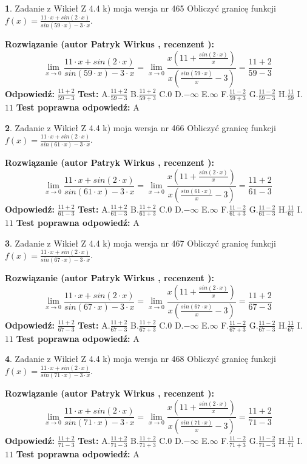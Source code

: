 \documentclass[12pt, a4paper]{article}
\theoremstyle{definition} %
\newtheorem{zad}{}
\newcommand{\zadStart}[1]{\begin{zad}#1\newline}
\newcommand{\zadStop}{\end{zad}}
\newcommand{\rozwStart}[2]{\noindent \textbf{Rozwiązanie (autor #1 , recenzent #2): }\newline}
\newcommand{\rozwStop}{\newline}
\newcommand{\odpStart}{\noindent \textbf{Odpowiedź:}\newline}
\newcommand{\odpStop}{\newline}
\newcommand{\testStart}{\noindent \textbf{Test:}\newline}
\newcommand{\testStop}{\newline}
\newcommand{\kluczStart}{\noindent \textbf{Test poprawna odpowiedź:}\newline}
\newcommand{\kluczStop}{\newline}
\begin{document}
\zadStart{Zadanie z Wikieł Z 4.4 k) moja wersja nr 465}
Obliczyć granicę funkcji $f(x)=\frac{11\cdot x +sin(2\cdot x)}{sin(59\cdot x) -3\cdot x}$.
\zadStop
\rozwStart{Patryk Wirkus}{}
$$\lim\limits_{x\to 0}\frac{11\cdot x +sin(2\cdot x)}{sin(59\cdot x) -3\cdot x}
=\lim\limits_{x\to 0}\frac{x(11+\frac{sin(2\cdot x)}{x})}{x(\frac{sin(59\cdot x)}{x}-3)}
=\frac{11+2}{59-3}$$
\rozwStop
\odpStart
$\frac{11+2}{59-3}$
\odpStop
\testStart
A.$\frac{11+2}{59-3}$
B.$\frac{11+2}{59+3}$
C.$0$
D.$-\infty$
E.$\infty$
F.$\frac{11-2}{59+3}$
G.$\frac{11-2}{59-3}$
H.$\frac{11}{59}$
I.$11$
\testStop
\kluczStart
A
\kluczStop



\zadStart{Zadanie z Wikieł Z 4.4 k) moja wersja nr 466}
Obliczyć granicę funkcji $f(x)=\frac{11\cdot x +sin(2\cdot x)}{sin(61\cdot x) -3\cdot x}$.
\zadStop
\rozwStart{Patryk Wirkus}{}
$$\lim\limits_{x\to 0}\frac{11\cdot x +sin(2\cdot x)}{sin(61\cdot x) -3\cdot x}
=\lim\limits_{x\to 0}\frac{x(11+\frac{sin(2\cdot x)}{x})}{x(\frac{sin(61\cdot x)}{x}-3)}
=\frac{11+2}{61-3}$$
\rozwStop
\odpStart
$\frac{11+2}{61-3}$
\odpStop
\testStart
A.$\frac{11+2}{61-3}$
B.$\frac{11+2}{61+3}$
C.$0$
D.$-\infty$
E.$\infty$
F.$\frac{11-2}{61+3}$
G.$\frac{11-2}{61-3}$
H.$\frac{11}{61}$
I.$11$
\testStop
\kluczStart
A
\kluczStop



\zadStart{Zadanie z Wikieł Z 4.4 k) moja wersja nr 467}
Obliczyć granicę funkcji $f(x)=\frac{11\cdot x +sin(2\cdot x)}{sin(67\cdot x) -3\cdot x}$.
\zadStop
\rozwStart{Patryk Wirkus}{}
$$\lim\limits_{x\to 0}\frac{11\cdot x +sin(2\cdot x)}{sin(67\cdot x) -3\cdot x}
=\lim\limits_{x\to 0}\frac{x(11+\frac{sin(2\cdot x)}{x})}{x(\frac{sin(67\cdot x)}{x}-3)}
=\frac{11+2}{67-3}$$
\rozwStop
\odpStart
$\frac{11+2}{67-3}$
\odpStop
\testStart
A.$\frac{11+2}{67-3}$
B.$\frac{11+2}{67+3}$
C.$0$
D.$-\infty$
E.$\infty$
F.$\frac{11-2}{67+3}$
G.$\frac{11-2}{67-3}$
H.$\frac{11}{67}$
I.$11$
\testStop
\kluczStart
A
\kluczStop



\zadStart{Zadanie z Wikieł Z 4.4 k) moja wersja nr 468}
Obliczyć granicę funkcji $f(x)=\frac{11\cdot x +sin(2\cdot x)}{sin(71\cdot x) -3\cdot x}$.
\zadStop
\rozwStart{Patryk Wirkus}{}
$$\lim\limits_{x\to 0}\frac{11\cdot x +sin(2\cdot x)}{sin(71\cdot x) -3\cdot x}
=\lim\limits_{x\to 0}\frac{x(11+\frac{sin(2\cdot x)}{x})}{x(\frac{sin(71\cdot x)}{x}-3)}
=\frac{11+2}{71-3}$$
\rozwStop
\odpStart
$\frac{11+2}{71-3}$
\odpStop
\testStart
A.$\frac{11+2}{71-3}$
B.$\frac{11+2}{71+3}$
C.$0$
D.$-\infty$
E.$\infty$
F.$\frac{11-2}{71+3}$
G.$\frac{11-2}{71-3}$
H.$\frac{11}{71}$
I.$11$
\testStop
\kluczStart
A
\kluczStop
\end{document}

